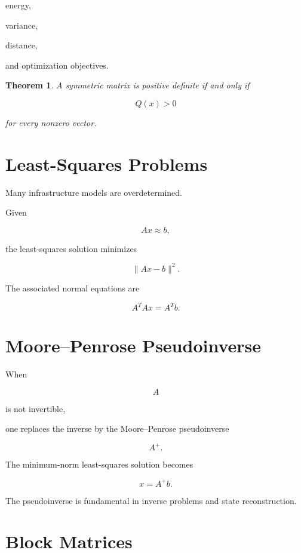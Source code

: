 \documentclass[11pt,fleqn]{book}
\numberwithin{equation}{chapter}
\theoremstyle{plain}
\newtheorem{theorem}{Theorem}[chapter]
\theoremstyle{definition}
\theoremstyle{remark}
\begin{document}
energy,

variance,

distance,

and optimization objectives.


\begin{theorem}

A symmetric matrix is positive definite if and only if

\[
Q(x)>0
\]

for every nonzero vector.

\end{theorem}


\section{Least-Squares Problems}

Many infrastructure models are overdetermined.

Given

\[
Ax\approx b,
\]

the least-squares solution minimizes

\[
\|Ax-b\|^2.
\]

The associated normal equations are

\[
\boxed{
A^TAx
=
A^Tb.
}
\]


\section{Moore--Penrose Pseudoinverse}

When

\[
A
\]

is not invertible,

one replaces the inverse by the Moore--Penrose pseudoinverse

\[
A^+.
\]

The minimum-norm least-squares solution becomes

\[
\boxed{
x
=
A^+b.
}
\]

The pseudoinverse is fundamental in inverse problems and state
reconstruction.


\section{Block Matrices}
\end{document}
